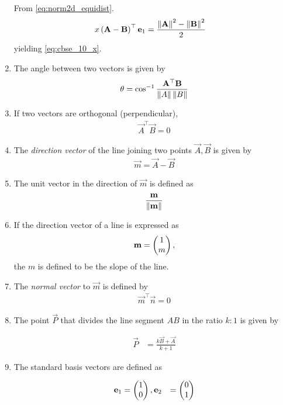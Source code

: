 \documentclass[journal,12pt,twocolumn]{IEEEtran}
\renewcommand\thesection{\arabic{section}}
\renewcommand\thesubsection{\thesection.\arabic{subsection}}
\begin{document}
\begin{enumerate}[label=\thesubsection.\arabic*.,ref=\thesubsection.\theenumi]
  \solution 
  From \eqref{eq:norm2d_equidist}.
  \begin{align}
	   x\left(\mathbf{A}-\mathbf{B}\right)^{\top }\mathbf{e}_1
		  &=
	  \frac{\left\lVert\mathbf{A}\right\rVert^2 -\left\lVert\mathbf{B}\right\rVert^2 }{2}
   \end{align}
	  yielding \eqref{eq:cbse_10_x}.
  \item The angle between two vectors is given by 
  \begin{align}
    \label{eq:angle2d}
    \theta = \cos^{-1}\frac{\mathbf{A}^{\top} \mathbf{B}}{\left\lVert A\right\rVert\left\lVert B\right\rVert}
  \end{align}
  \item If two vectors are orthogonal (perpendicular), 
  \begin{align}
    \label{eq:angle2d_orth}
\vec{A}^{\top} \vec{B} = 0
  \end{align}

  \item The {\em direction vector} of the line joining two points $\vec{A},\vec{B}$ is given by 
  \begin{align}
    \label{eq:dir_vec}
    \vec{m} = \vec{A}-\vec{B}
  \end{align}
\item The unit vector in the direction of $\vec{m}$ is defined as
\begin{align}
    \frac{\mathbf{m}}{\left\lVert\mathbf{m}\right\rVert}
\end{align}
\item If the direction vector of a line is expressed as 
	\begin{align}
    \mathbf{m} = \begin{pmatrix}1\\m\end{pmatrix},
\end{align}
 the $m$ is defined to be the {\em} slope of the line. 
  \item The {\em normal vector} to $\vec{m}$ is defined by 
  \begin{align}
    \label{eq:normal_vec}
    \vec{m}^{\top}  \vec{n} = 0
  \end{align}
  \item The point $\vec{P}$ that divides the line segment $AB$ in the ratio $k:1$  is given by 

  \begin{align}
	  \vec{P}&= \frac{k\vec{B}+ \vec{A}}{k+1}
	  \label{eq:section_formula}
  \end{align}
\item  The standard basis vectors are defined as 

  \begin{align}
  \mathbf{e}_1&= \begin{pmatrix}1\\0\end{pmatrix}, 
  \mathbf{e}_2&= \begin{pmatrix}0\\1\end{pmatrix} 
  \end{align}
\end{enumerate}
\end{document}
